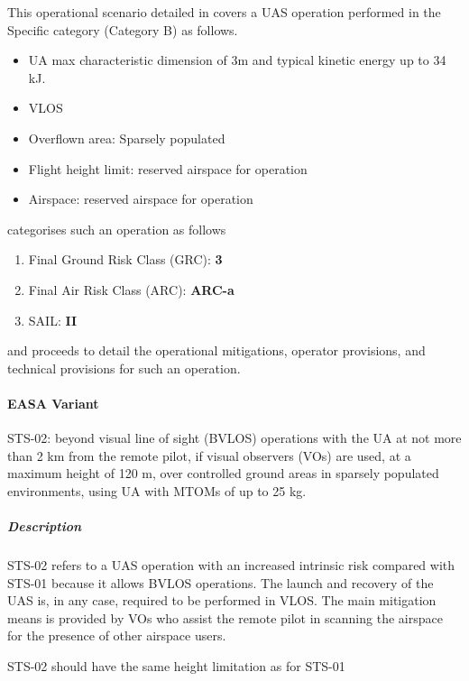 \documentclass{ua_wgs_base}
\begin{document}
This operational scenario detailed in \cite{JARUS-SORA/STS-02} covers
a UAS operation performed in the Specific category (Category B) as
follows.
\begin{itemize}
\item UA max characteristic dimension of 3m and typical kinetic energy up
to 34 kJ.
\item VLOS
\item Overflown area: Sparsely populated
\item Flight height limit: reserved airspace for operation
\item Airspace: reserved airspace for operation
\end{itemize}
\cite{JARUS-SORA/JAR-DEL-WG6-D.04} categorises such an operation
as follows
\begin{enumerate}
\item Final Ground Risk Class (GRC): \textbf{3}
\item Final Air Risk Class (ARC): \textbf{ARC-a}
\item SAIL: \textbf{II}
\end{enumerate}
and proceeds to detail the operational mitigations, operator provisions,
and technical provisions for such an operation.

\paragraph{EASA Variant}

STS-02: beyond visual line of sight (BVLOS) operations with the UA
at not more than 2 km from the remote pilot, if visual observers (VOs)
are used, at a maximum height of 120 m, over controlled ground areas
in sparsely populated environments, using UA with MTOMs of up to 25
kg.

\subparagraph{Description}

STS-02 refers to a UAS operation with an increased intrinsic risk
compared with STS-01 because it allows BVLOS operations. The launch
and recovery of the UAS is, in any case, required to be performed
in VLOS. The main mitigation means is provided by VOs who assist the
remote pilot in scanning the airspace for the presence of other airspace
users. 

STS-02 should have the same height limitation as for STS-01
\end{document}
